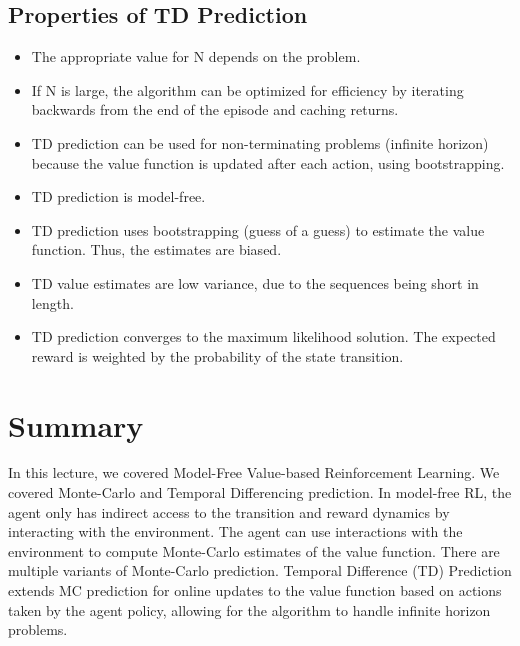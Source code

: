 \documentclass[11pt]{article}
\begin{document}
\subsection{Properties of TD Prediction}
\begin{itemize}
    \item The appropriate value for N depends on the problem.
    \item If N is large, the algorithm can be optimized for efficiency by iterating backwards from the end of the episode and caching returns.
    \item TD prediction can be used for non-terminating problems (infinite horizon) because the value function is updated after each action, using bootstrapping.
    \item TD prediction is model-free.
    \item TD prediction uses bootstrapping (guess of a guess) to estimate the value function. Thus, the estimates are biased.
    \item TD value estimates are low variance, due to the sequences being short in length. 
    \item TD prediction converges to the maximum likelihood solution. The expected reward is weighted by the probability of the state transition. 
\end{itemize}


\section{Summary}
In this lecture, we covered Model-Free Value-based Reinforcement Learning. We covered Monte-Carlo and Temporal Differencing prediction. In model-free RL, the agent only has indirect access to the transition and reward dynamics by interacting with the environment. The agent can use interactions with the environment to compute Monte-Carlo estimates of the value function. There are multiple variants of Monte-Carlo prediction. Temporal Difference (TD) Prediction extends MC prediction for online updates to the value function based on actions taken by the agent policy, allowing for the algorithm to handle infinite horizon problems.

\end{document}
